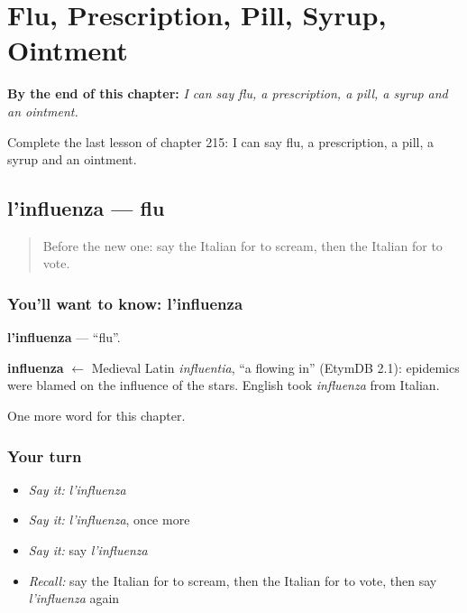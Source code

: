 
\chapter{Flu, Prescription, Pill, Syrup, Ointment}
\label{ch:it-flu-prescription-pill-syrup-ointment}

\begin{chapteropening}
\textbf{By the end of this chapter:} \emph{I can say flu, a prescription, a pill, a syrup and an ointment.}

Complete the last lesson of chapter 215: I can say flu, a prescription, a pill, a syrup and an ointment.
\end{chapteropening}

\section[l'influenza]{l'influenza — flu}

\label{lesson:IT-C215-influenza}



\begin{quote}
Before the new one: say the Italian for to scream, then the Italian for to vote.
\end{quote}

\subsection*{You'll want to know: l'influenza}
\textbf{l'influenza} — \textquotedblleft{}flu\textquotedblright{}.

\begin{cousinweb}
\textbf{influenza} $\leftarrow$ Medieval Latin \emph{influentia}, \textquotedblleft{}a flowing in\textquotedblright{} (EtymDB 2.1): epidemics were blamed on the influence of the stars. English took \emph{influenza} from Italian.
\end{cousinweb}

\begin{grammarlens}[title={What you've built}]
One more word for this chapter.
\end{grammarlens}

\subsection*{Your turn}
\begin{itemize}
\raggedright
  \item \emph{Say it:} \emph{l'influenza}
  \item \emph{Say it:} \emph{l'influenza}, once more
  \item \emph{Say it:} say \emph{l'influenza}
  \item \emph{Recall:} say the Italian for to scream, then the Italian for to vote, then say \emph{l'influenza} again
\end{itemize}

